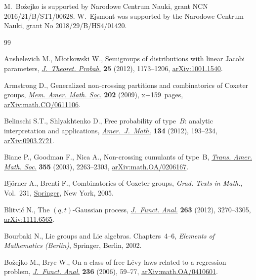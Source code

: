 \documentclass[pdftex]{sigma}
\numberwithin{equation}{section}
\begin{document}
M.~Bo\.zejko is supported by Narodowe Centrum Nauki, grant NCN 2016/21/B/ST1/00628.
W.~Ejsmont was supported by the Narodowe Centrum Nauki, grant No 2018/29/B/HS4/01420.

\begin{thebibliography}{99}
\footnotesize\itemsep=0pt

Anshelevich M., M{\l}otkowski W., Semigroups of distributions with linear
 {J}acobi parameters, \href{https://doi.org/10.1007/s10959-012-0403-x}{\textit{J.~Theoret. Probab.}} \textbf{25} (2012),
 1173--1206, \href{https://arxiv.org/abs/1001.1540}{arXiv:1001.1540}.

Armstrong D., Generalized non-crossing partitions and combinatorics of {C}oxeter
 groups, \href{https://doi.org/10.1090/S0065-9266-09-00565-1}{\textit{Mem. Amer. Math. Soc.}} \textbf{202} (2009), x+159~pages,
 \href{https://arxiv.org/abs/math.CO/0611106}{arXiv:math.CO/0611106}.

Belinschi S.T., Shlyakhtenko D., Free probability of type~{$B$}: analytic
 interpretation and applications, \href{https://doi.org/10.1353/ajm.2012.0003}{\textit{Amer.~J.~Math.}} \textbf{134} (2012),
 193--234, \href{https://arxiv.org/abs/0903.2721}{arXiv:0903.2721}.

Biane P., Goodman F., Nica A., Non-crossing cumulants of type~{B},
 \href{https://doi.org/10.1090/S0002-9947-03-03196-9}{\textit{Trans. Amer. Math. Soc.}} \textbf{355} (2003), 2263--2303,
 \href{https://arxiv.org/abs/math.OA/0206167}{arXiv:math.OA/0206167}.

Bj\"orner A., Brenti F., Combinatorics of {C}oxeter groups, \textit{Grad. Texts
 in Math.}, Vol.~231, \href{https://doi.org/10.1007/3-540-27596-7}{Springer}, New York, 2005.

Blitvi\'c N., The {$(q,t)$}-{G}aussian process, \href{https://doi.org/10.1016/j.jfa.2012.08.006}{\textit{J.~Funct. Anal.}}
 \textbf{263} (2012), 3270--3305, \href{https://arxiv.org/abs/1111.6565}{arXiv:1111.6565}.

Bourbaki N., Lie groups and {L}ie algebras. {C}hapters~4--6, \textit{Elements of
 Mathematics (Berlin)}, Springer, Berlin, 2002.

Bo\.zejko M., Bryc W., On a class of free {L}\'evy laws related to a regression
 problem, \href{https://doi.org/10.1016/j.jfa.2005.09.010}{\textit{J.~Funct. Anal.}} \textbf{236} (2006), 59--77,
 \href{https://arxiv.org/abs/math.OA/0410601}{arXiv:math.OA/0410601}.


\end{thebibliography}
\end{document}

